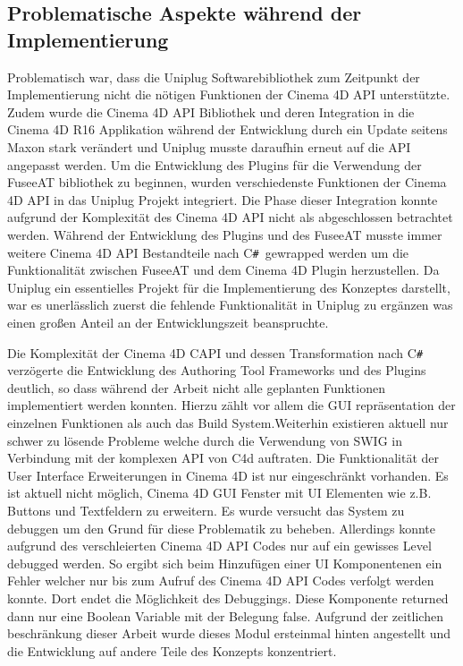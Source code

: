 \documentclass[pagesize, paper=a4, fontsize=12pt, titlepage=true, headings=small, headnosepline, abstractoff, liststotoc, nochapterprefix, plainheadsepline, twoside]{scrreprt}
\newcommand{\CSS}{C\texttt{\# }}
\newcommand{\CPP}{C\nolinebreak\hspace{-.05em}\raisebox{.4ex}{\tiny\bf +}\nolinebreak\hspace{-.10em}\raisebox{.4ex}{\tiny\bf +}}
\begin{document}
\subsection{Problematische Aspekte während der Implementierung}
Problematisch war, dass die Uniplug Softwarebibliothek zum Zeitpunkt der Implementierung nicht die nötigen Funktionen der Cinema 4D API unterstützte. Zudem wurde die Cinema 4D API Bibliothek und deren Integration in die Cinema 4D R16 Applikation während der Entwicklung durch ein Update seitens Maxon stark verändert und Uniplug musste daraufhin erneut auf die API angepasst werden. Um die Entwicklung des Plugins für die Verwendung der FuseeAT bibliothek zu beginnen, wurden verschiedenste  Funktionen der Cinema 4D API in das Uniplug Projekt integriert. Die Phase dieser Integration konnte aufgrund der Komplexität des Cinema 4D API nicht als abgeschlossen betrachtet werden. Während der Entwicklung des Plugins und des FuseeAT musste immer weitere Cinema 4D API Bestandteile nach \CSS gewrapped werden um die Funktionalität zwischen FuseeAT und dem Cinema 4D Plugin herzustellen. Da Uniplug ein essentielles Projekt für die Implementierung des Konzeptes darstellt, war es unerlässlich zuerst die fehlende Funktionalität in Uniplug zu ergänzen was einen großen Anteil an der Entwicklungszeit beanspruchte.

Die Komplexität der Cinema 4D \CPP API und dessen Transformation nach \CSS verzögerte die Entwicklung des Authoring Tool Frameworks und des Plugins deutlich, so dass während der Arbeit nicht alle geplanten Funktionen implementiert werden konnten. Hierzu zählt vor allem die GUI repräsentation der einzelnen Funktionen als auch das Build System.Weiterhin existieren aktuell nur schwer zu lösende Probleme welche durch die Verwendung von SWIG  in Verbindung mit der komplexen API von C4d auftraten. Die Funktionalität der User Interface Erweiterungen in Cinema 4D ist nur eingeschränkt vorhanden. Es ist aktuell nicht möglich, Cinema 4D GUI Fenster mit UI Elementen wie z.B. Buttons und Textfeldern zu erweitern. Es wurde versucht das System zu debuggen um den Grund für diese Problematik zu beheben. Allerdings konnte aufgrund des verschleierten Cinema 4D API Codes nur auf ein gewisses Level debugged werden. So ergibt sich beim Hinzufügen einer UI Komponentenen ein Fehler welcher nur bis zum Aufruf des Cinema 4D API Codes verfolgt werden konnte. Dort endet die Möglichkeit des Debuggings. Diese Komponente returned dann nur eine Boolean Variable mit der Belegung false. Aufgrund der zeitlichen beschränkung dieser Arbeit wurde dieses Modul ersteinmal hinten angestellt und die Entwicklung auf andere Teile des Konzepts konzentriert.
\end{document}
